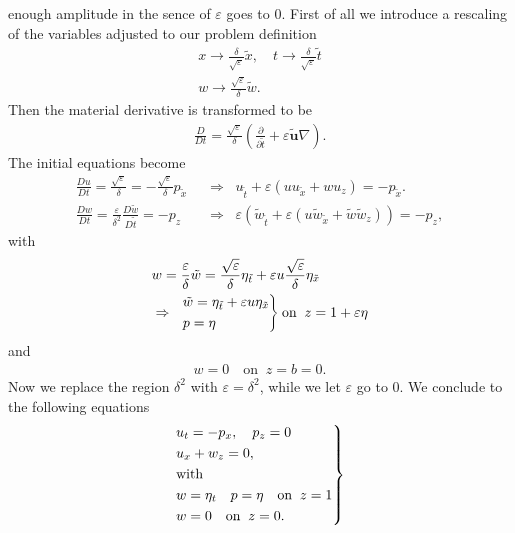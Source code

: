 enough amplitude in the sence of $\varepsilon$ goes to $0$. First of all we
introduce a rescaling of the variables adjusted to our problem definition
\begin{align}
    x \rightarrow \frac{\delta}{\sqrt{\varepsilon} }\tilde{x}, \quad t
    \rightarrow \frac{\delta}{\sqrt{\varepsilon} }\tilde{t}\\
    w \rightarrow \frac{\sqrt{\varepsilon} }{\delta}\tilde{w}.
\end{align}
Then the material derivative is transformed to be
\begin{align}
    \frac{D}{Dt} = \frac{\sqrt{\varepsilon}}{\delta}(\frac{\partial
    }{\partial \tilde{t}} +\varepsilon \tilde{\mathbf{u}} \nabla).
\end{align}
The initial equations become
\begin{align}
    \frac{Du}{Dt} = \frac{\sqrt{\varepsilon}}{\delta} =-
    \frac{\sqrt{\varepsilon} }{\delta} p_{\tilde{x}}\;\; &\Rightarrow\;\;
    u_{\tilde{t}} + \varepsilon(u u_{\tilde{x}} + wu_z)= -p_{\tilde{x}}.\\
    \frac{Dw}{Dt} = \frac{\varepsilon}{\delta^2}
    \frac{D\tilde{w}}{D\tilde{t}}=-p_z \;\;&\Rightarrow\;\;
    \varepsilon\left(\tilde{w}_{\tilde{t}} + \varepsilon\left(
    u\tilde{w}_{\tilde{x}}+ \tilde{w}\tilde{w}_z \right)   \right)  = -p_z,
\end{align}
with
\begin{align}
    &w
    = \frac{\varepsilon}{\delta}\tilde{w}
    = \frac{\sqrt{\varepsilon} }{\delta}
    \eta_{\tilde{t}}+\varepsilon u\frac{\sqrt{\varepsilon}}{\delta}
    \eta_{\tilde{x}}\\
    &\Rightarrow\;\;
    \begin{drcases}
    \tilde{w} = \eta_{\tilde{t}}+ \varepsilon u
    \eta_{\tilde{x}}\\
    p=\eta
    \end{drcases}
    \text{on}\;\; z = 1+\varepsilon\eta
\end{align}
and
\begin{align}
    w = 0 \quad \text{on}\;\; z= b = 0.
\end{align}
Now we replace the region $\delta^2$ with $\varepsilon = \delta^2$, while we
let $\varepsilon$ go to $0$. We conclude to the following equations
\begin{align}\label{eq:kdv3}
    \begin{drcases}
    u_t = -p_x, \quad p_z = 0\\
    u_x + w_z = 0,\\
    \text{with}\\
    w=\eta_t \quad p=\eta \quad \text{on}\;\; z= 1\\
    w = 0 \quad \text{on}\;\; z= 0.
    \end{drcases}
\end{align}
